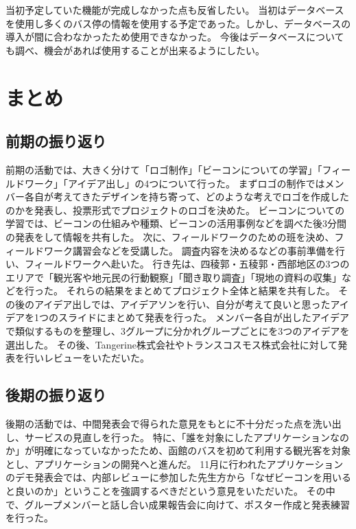 \documentclass[openany,11pt,papersize]{jsbook}
\begin{document}
当初予定していた機能が完成しなかった点も反省したい。
当初はデータベースを使用し多くのバス停の情報を使用する予定であった。しかし、データベースの導入が間に合わなかったため使用できなかった。
今後はデータベースについても調べ、機会があれば使用することが出来るようにしたい。


\chapter{まとめ}
\section{前期の振り返り}
前期の活動では、大きく分けて「ロゴ制作」「ビーコンについての学習」「フィールドワーク」「アイデア出し」の4つについて行った。
まずロゴの制作ではメンバー各自が考えてきたデザインを持ち寄って、どのような考えでロゴを作成したのかを発表し、投票形式でプロジェクトのロゴを決めた。
ビーコンについての学習では、ビーコンの仕組みや種類、ビーコンの活用事例などを調べた後3分間の発表をして情報を共有した。
次に、フィールドワークのための班を決め、フィールドワーク講習会などを受講した。
調査内容を決めるなどの事前準備を行い、フィールドワークへ赴いた。
行き先は、四稜郭・五稜郭・西部地区の3つのエリアで「観光客や地元民の行動観察」「聞き取り調査」「現地の資料の収集」などを行った。
それらの結果をまとめてプロジェクト全体と結果を共有した。
その後のアイデア出しでは、アイデアソンを行い、自分が考えて良いと思ったアイデアを1つのスライドにまとめて発表を行った。
メンバー各自が出したアイデアで類似するものを整理し、3グループに分かれグループごとにを3つのアイデアを選出した。
その後、Tangerine株式会社やトランスコスモス株式会社に対して発表を行いレビューをいただいた。


\section{後期の振り返り}
後期の活動では、中間発表会で得られた意見をもとに不十分だった点を洗い出し、サービスの見直しを行った。
特に、「誰を対象にしたアプリケーションなのか」が明確になっていなかったため、函館のバスを初めて利用する観光客を対象とし、アプリケーションの開発へと進んだ。
11月に行われたアプリケーションのデモ発表会では、内部レビューに参加した先生方から「なぜビーコンを用いると良いのか」ということを強調するべきだという意見をいただいた。
その中で、グループメンバーと話し合い成果報告会に向けて、ポスター作成と発表練習を行った。
\end{document}
